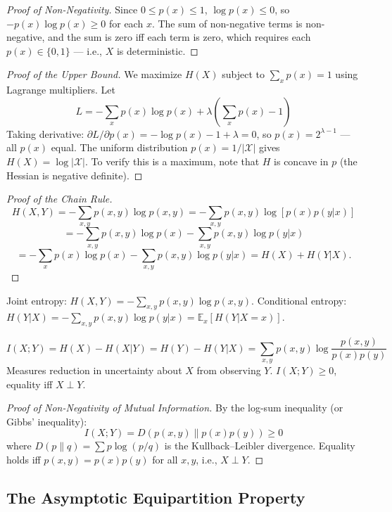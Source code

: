 \begin{proof}[Proof of Non-Negativity]
Since $0 \le p(x) \le 1$, $\log p(x) \le 0$, so $-p(x)\log p(x) \ge 0$ for each $x$. The sum of non-negative terms is non-negative, and the sum is zero iff each term is zero, which requires each $p(x) \in \{0,1\}$ — i.e., $X$ is deterministic.
\end{proof}

\begin{proof}[Proof of the Upper Bound]
We maximize $H(X)$ subject to $\sum_x p(x)=1$ using Lagrange multipliers. Let
\[
L = -\sum_x p(x)\log p(x) + \lambda\left(\sum_x p(x)-1\right)
\]
Taking derivative: $\partial L/\partial p(x) = -\log p(x) - 1 + \lambda = 0$, so $p(x) = 2^{\lambda-1}$ — all $p(x)$ equal. The uniform distribution $p(x) = 1/|\mathcal{X}|$ gives $H(X) = \log |\mathcal{X}|$. To verify this is a maximum, note that $H$ is concave in $p$ (the Hessian is negative definite).
\end{proof}

\begin{proof}[Proof of the Chain Rule]
\[
H(X,Y) = -\sum_{x,y} p(x,y) \log p(x,y)
= -\sum_{x,y} p(x,y) \log[p(x)p(y|x)]
\]
\[
= -\sum_{x,y} p(x,y)\log p(x) - \sum_{x,y} p(x,y)\log p(y|x)
\]
\[
= -\sum_x p(x)\log p(x) - \sum_{x,y} p(x,y)\log p(y|x) = H(X) + H(Y|X).
\]
\end{proof}

\begin{definition}
Joint entropy: $H(X,Y) = -\sum_{x,y} p(x,y)\log p(x,y)$.
Conditional entropy: $H(Y|X) = -\sum_{x,y} p(x,y)\log p(y|x) = \mathbb{E}_x[H(Y|X=x)]$.
\end{definition}

\begin{definition}
\[
I(X;Y) = H(X) - H(X|Y) = H(Y) - H(Y|X) = \sum_{x,y} p(x,y) \log \frac{p(x,y)}{p(x)p(y)}
\]
Measures reduction in uncertainty about $X$ from observing $Y$. $I(X;Y) \ge 0$, equality iff $X \perp Y$.
\end{definition}

\begin{proof}[Proof of Non-Negativity of Mutual Information]
By the log-sum inequality (or Gibbs' inequality):
\[
I(X;Y) = D(p(x,y) \| p(x)p(y)) \ge 0
\]
where $D(p\|q) = \sum p\log(p/q)$ is the Kullback--Leibler divergence. Equality holds iff $p(x,y) = p(x)p(y)$ for all $x,y$, i.e., $X \perp Y$.
\end{proof}

\subsection{The Asymptotic Equipartition Property}
\label{sec:information:aep}

